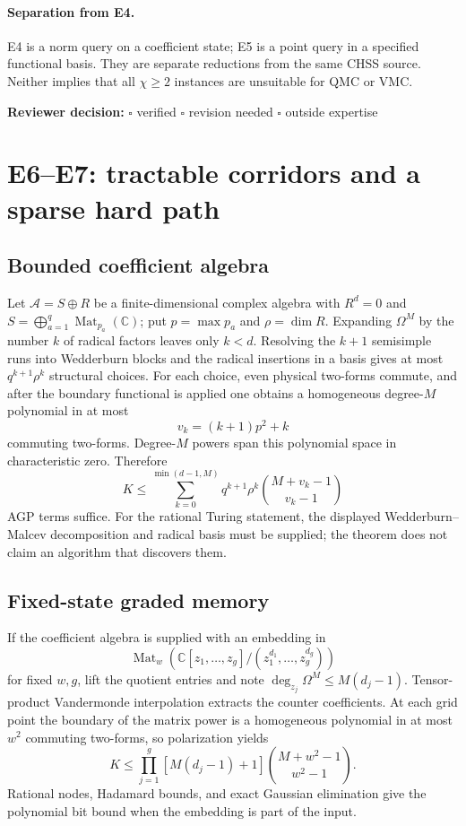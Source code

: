 \documentclass[11pt]{article}
\theoremstyle{definition}
\newcommand{\Mat}{\operatorname{Mat}}
\newcommand{\reviewline}{\par\smallskip\noindent
  \textbf{Reviewer decision:} $\square$ verified \quad $\square$ revision
  needed \quad $\square$ outside expertise\par\medskip}
\begin{document}
\paragraph{Separation from E4.}
E4 is a norm query on a coefficient state; E5 is a point query in a specified
functional basis.  They are separate reductions from the same CHSS source.
Neither implies that all $\chi\ge2$ instances are unsuitable for QMC or VMC.

\reviewline

\section{E6--E7: tractable corridors and a sparse hard path}

\subsection{Bounded coefficient algebra}

Let $\mathcal A=S\oplus R$ be a finite-dimensional complex algebra with
$R^d=0$ and
$S=\bigoplus_{a=1}^q\Mat_{p_a}(\mathbb C)$; put
$p=\max p_a$ and $\rho=\dim R$.  Expanding $\Omega^M$ by the number $k$ of
radical factors leaves only $k<d$.  Resolving the $k+1$ semisimple runs into
Wedderburn blocks and the radical insertions in a basis gives at most
$q^{k+1}\rho^k$ structural choices.  For each choice, even physical two-forms
commute, and after the boundary functional is applied one obtains a homogeneous
degree-$M$ polynomial in at most
\begin{equation}
v_k=(k+1)p^2+k
\end{equation}
commuting two-forms.  Degree-$M$ powers span this polynomial space in
characteristic zero.  Therefore
\begin{equation}
K\le\sum_{k=0}^{\min(d-1,M)}q^{k+1}\rho^k
\binom{M+v_k-1}{v_k-1}
\end{equation}
AGP terms suffice.  For the rational Turing statement, the displayed
Wedderburn--Malcev decomposition and radical basis must be supplied; the
theorem does not claim an algorithm that discovers them.

\subsection{Fixed-state graded memory}

If the coefficient algebra is supplied with an embedding in
\begin{equation}
\Mat_w\!\left(\mathbb C[z_1,\ldots,z_g]/
(z_1^{d_1},\ldots,z_g^{d_g})\right)
\end{equation}
for fixed $w,g$, lift the quotient entries and note
$\deg_{z_j}\Omega^M\le M(d_j-1)$.  Tensor-product Vandermonde interpolation
extracts the counter coefficients.  At each grid point the boundary of the
matrix power is a homogeneous polynomial in at most $w^2$ commuting
two-forms, so polarization yields
\begin{equation}
K\le\prod_{j=1}^g[M(d_j-1)+1]
\binom{M+w^2-1}{w^2-1}.
\end{equation}
Rational nodes, Hadamard bounds, and exact Gaussian elimination give the
polynomial bit bound when the embedding is part of the input.
\end{document}
